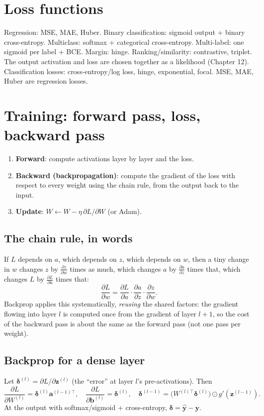 \section{Loss functions}
Regression: MSE, MAE, Huber. Binary classification: sigmoid output + binary cross-entropy. Multiclass: softmax + categorical cross-entropy. Multi-label:
one sigmoid per label + BCE. Margin: hinge. Ranking/similarity: contrastive, triplet. The output activation and loss are chosen together as a
likelihood (Chapter 12). Classification losses: cross-entropy/log loss, hinge, exponential, focal. MSE, MAE, Huber are regression losses.

\section{Training: forward pass, loss, backward pass}
\begin{enumerate}
\item \textbf{Forward}: compute activations layer by layer and the loss.
\item \textbf{Backward (backpropagation)}: compute the gradient of the loss with respect to every weight using the chain rule, from the output back to the input.
\item \textbf{Update}: $W\leftarrow W - \eta\,\partial L/\partial W$ (or Adam).
\end{enumerate}

\subsection{The chain rule, in words}
If $L$ depends on $a$, which depends on $z$, which depends on $w$, then a tiny change in $w$ changes $z$ by $\frac{\partial z}{\partial w}$ times as much, which
changes $a$ by $\frac{\partial a}{\partial z}$ times that, which changes $L$ by $\frac{\partial L}{\partial a}$ times that:
\[ \frac{\partial L}{\partial w} = \frac{\partial L}{\partial a}\cdot\frac{\partial a}{\partial z}\cdot\frac{\partial z}{\partial w}. \]
Backprop applies this systematically, \emph{reusing} the shared factors: the gradient flowing into layer $l$ is computed once from the gradient of layer
$l+1$, so the cost of the backward pass is about the same as the forward pass (not one pass per weight).

\subsection{Backprop for a dense layer}
Let $\boldsymbol\delta^{(l)} = \partial L/\partial\mathbf z^{(l)}$ (the ``error'' at layer $l$'s pre-activations). Then
\[ \frac{\partial L}{\partial W^{(l)}} = \boldsymbol\delta^{(l)}\mathbf a^{(l-1)\top},\quad \frac{\partial L}{\partial\mathbf b^{(l)}} = \boldsymbol\delta^{(l)},\quad
\boldsymbol\delta^{(l-1)} = \big(W^{(l)\top}\boldsymbol\delta^{(l)}\big)\odot g'(\mathbf z^{(l-1)}). \]
At the output with softmax/sigmoid + cross-entropy, $\boldsymbol\delta = \hat{\mathbf y} - \mathbf y$.

